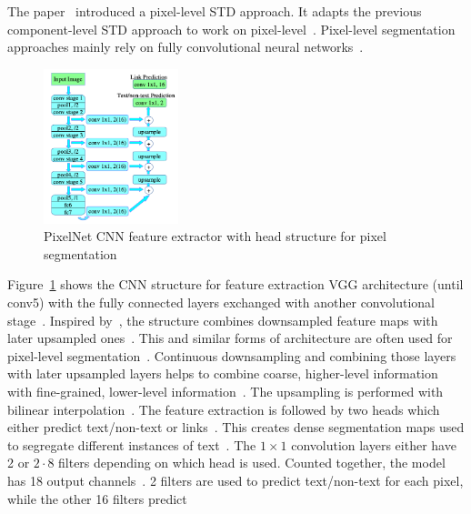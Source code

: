 The paper~\cite{deng_pixellink_2018} introduced a pixel-level \ac{STD} approach.
It adapts the previous component-level \ac{STD} approach to work on
pixel-level~\citep{deng_pixellink_2018}.
Pixel-level segmentation approaches mainly rely on fully convolutional neural
networks~\citep{dai_fused_2018}.
\begin{figure}[ht]
    \centering
    \includegraphics[width=0.35\textwidth]{img/STD-seg-based-CNN-Deng-PixelLink-2018.png}
    \caption[Feature extractor and prediction head for pixel segmentation]{%
        PixelNet CNN feature extractor with head structure for pixel
        segmentation\label{fig:STD-segbased-pixel-CNN}
    }
\end{figure}
Figure~\ref{fig:STD-segbased-pixel-CNN} shows the \ac{CNN} structure for feature extraction
VGG architecture (until conv5) with the fully connected layers exchanged with
another convolutional stage~\citep{deng_pixellink_2018}.
Inspired by~\cite{long_fully_2015}, the structure combines downsampled feature maps with later
upsampled ones~\citep{deng_pixellink_2018}.
This and similar forms of architecture are often used for pixel-level
segmentation~\citep{deng_pixellink_2018,yao_scene_2016,wu_self-organized_2017,
long_textsnake_2018,wang_shape_2019}.
Continuous downsampling and combining those layers with later upsampled layers helps
to combine coarse, higher-level information with fine-grained, lower-level
information~\citep{long_fully_2015}.
The upsampling is performed with bilinear interpolation~\citep{deng_pixellink_2018}.
The feature extraction is followed by two heads which either predict text/non-text or
links~\citep{deng_pixellink_2018}.
This creates dense segmentation maps used to segregate different instances of
text~\citep{deng_pixellink_2018}.
The $1\times1$ convolution layers either have 2 or $2\cdot8$ filters depending on which head is used.
Counted together, the model has 18 output channels~\citep{deng_pixellink_2018}.
2 filters are used to predict text/non-text for each pixel, while the other 16 filters predict

